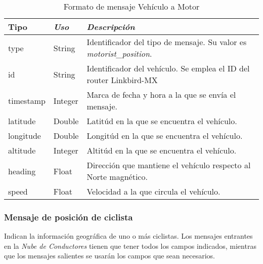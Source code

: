 \begin{table}[H]
	\centering
	\caption{Formato de mensaje Vehículo a Motor}\label{tab:CamposMensajePosVehMotNubeConductores}
	\begin{tabular}{lll}
		\toprule
			\textbf{Tipo} & \emph{Uso} & \emph{Descripción}\\
		\midrule
			type		&	String	&	Identificador del tipo de mensaje. Su valor es \emph{motorist\_position}.	\\
			id		&	String	&	Identificador del vehículo. Se emplea el ID del router Linkbird-MX		\\
			timestamp	&	Integer	&	Marca de fecha y hora a la que se envía el mensaje.					\\
			latitude	&	Double	&	Latitúd en la que se encuentra el vehículo. 						\\
			longitude	&	Double	&	Longitúd en la que se encuentra el vehículo.						\\
			altitude	&	Integer	&	Altitúd en la que se encuentra el vehículo.						\\
			heading	&	Float		&	Dirección que mantiene el vehículo respecto al Norte magnético.		\\
			speed	&	Float		&	Velocidad a la que circula el vehículo.							\\
		\bottomrule
	\end{tabular}
\end{table}

\subsubsection{Mensaje de posición de ciclista}\label{sssection:MensajePosCiclista}
Indican la información geográfica de uno o más ciclistas. Los mensajes entrantes
en la \emph{Nube de Conductores} tienen que tener todos los campos indicados, mientras
que los mensajes salientes se usarán los campos que sean necesarios.


